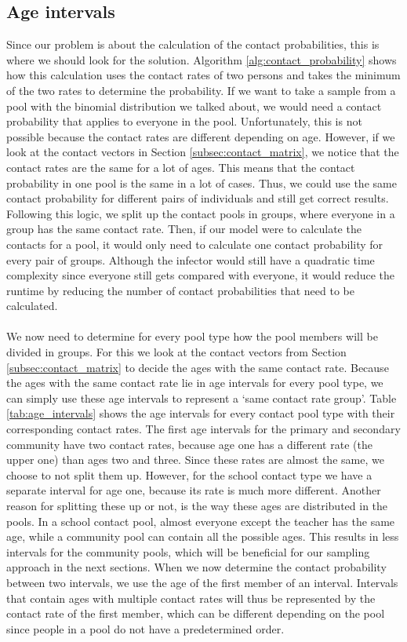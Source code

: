\subsection{Age intervals}
\label{subsec:age_intervals}
Since our problem is about the calculation of the contact probabilities, this is where we should look for the solution. Algorithm \ref{alg:contact_probability} shows how this calculation uses the contact rates of two persons and takes the minimum of the two rates to determine the probability. If we want to take a sample from a pool with the binomial distribution we talked about, we would need a contact probability that applies to everyone in the pool. Unfortunately, this is not possible because the contact rates are different depending on age. However, if we look at the contact vectors in Section \ref{subsec:contact_matrix}, we notice that the contact rates are the same for a lot of ages. This means that the contact probability in one pool is the same in a lot of cases. Thus, we could use the same contact probability for different pairs of individuals and still get correct results. Following this logic, we split up the contact pools in groups, where everyone in a group has the same contact rate. Then, if our model were to calculate the contacts for a pool, it would only need to calculate one contact probability for every pair of groups. Although the infector would still have a quadratic time complexity since everyone still gets compared with everyone, it would reduce the runtime by reducing the number of contact probabilities that need to be calculated.
\\\\
We now need to determine for every pool type how the pool members will be divided in groups. For this we look at the contact vectors from Section \ref{subsec:contact_matrix} to decide the ages with the same contact rate. Because the ages with the same contact rate lie in age intervals for every pool type, we can simply use these age intervals to represent a `same contact rate group'. Table \ref{tab:age_intervals} shows the age intervals for every contact pool type with their corresponding contact rates. The first age intervals for the primary and secondary community have two contact rates, because age one has a different rate (the upper one) than ages two and three. Since these rates are almost the same, we choose to not split them up. However, for the school contact type we have a separate interval for age one, because its rate is much more different. Another reason for splitting these up or not, is the way these ages are distributed in the pools. In a school contact pool, almost everyone except the teacher has the same age, while a community pool can contain all the possible ages. This results in less intervals for the community pools, which will be beneficial for our sampling approach in the next sections. When we now determine the contact probability between two intervals, we use the age of the first member of an interval. Intervals that contain ages with multiple contact rates will thus be represented by the contact rate of the first member, which can be different depending on the pool since people in a pool do not have a predetermined order.

